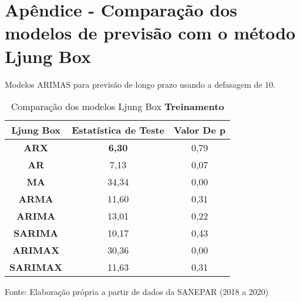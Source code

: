 
\section{Ap\^endice - Compara\c c\~ao dos modelos de previs\~ao com o m\'etodo Ljung Box}\label{sec:comtb18}



Modelos ARIMAS para previsão de longo prazo usando a defasagem de 10.

	\begin{table}[H]
		\centering
		\caption{Comparação dos modelos Ljung Box \textbf{Treinamento} }\label{tb:lbtrn}
	\begin{tabular}{@{}ccc@{}}
		\toprule
		\textbf{Ljung Box} & \textbf{Estatística de Teste} & \textbf{Valor De p} \\ \midrule
\textbf{ARX}       & \textbf{6,30}                          & 0,79                \\
\textbf{AR}        & 7,13                          & 0,07                \\
\textbf{MA}        & 34,34                         & 0,00                \\
\textbf{ARMA}      & 11,60                         & 0,31                \\
\textbf{ARIMA}     & 13,01                         & 0,22                \\
\textbf{SARIMA}    & 10,17                         & 0,43                \\
\textbf{ARIMAX}    & 30,36                         & 0,00                \\
\textbf{SARIMAX}   & 11,63                         & 0,31                \\ \bottomrule
	\end{tabular}

Fonte: Elaboração própria a partir de dados da SANEPAR (2018 a 2020)
	\end{table}

